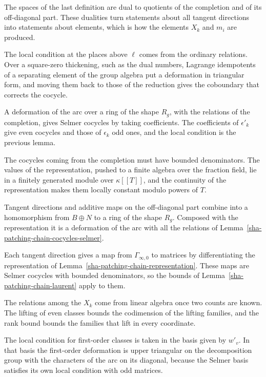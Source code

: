 The spaces of the last definition are dual to quotients of the completion and of its off-diagonal part. These dualities turn statements about all tangent directions into statements about elements, which is how the elements $X_k$ and $m_i$ are produced.

The local condition at the places above $\ell$ comes from the ordinary relations. Over a square-zero thickening, such as the dual numbers, Lagrange idempotents of a separating element of the group algebra put a deformation in triangular form, and moving them back to those of the reduction gives the coboundary that corrects the cocycle.

A deformation of the arc over a ring of the shape $R_g$, with the relations of the completion, gives Selmer cocycles by taking coefficients. The coefficients of $\epsilon'_k$ give even cocycles and those of $\epsilon_k$ odd ones, and the local condition is the previous lemma.

The cocycles coming from the completion must have bounded denominators. The values of the representation, pushed to a finite algebra over the fraction field, lie in a finitely generated module over $\kappa[[T]]$, and the continuity of the representation makes them locally constant modulo powers of $T$.

Tangent directions and additive maps on the off-diagonal part combine into a homomorphism from $B\oplus N$ to a ring of the shape $R_g$. Composed with the representation it is a deformation of the arc with all the relations of Lemma~\ref{sha-patching-chain-cocycles-selmer}.

Each tangent direction gives a map from $\Gamma_{\infty,0}$ to matrices by differentiating the representation of Lemma~\ref{sha-patching-chain-representation}. These maps are Selmer cocycles with bounded denominators, so the bounds of Lemma~\ref{sha-patching-chain-laurent} apply to them.

The relations among the $X_k$ come from linear algebra once two counts are known. The lifting of even classes bounds the codimension of the lifting families, and the rank bound bounds the families that lift in every coordinate.

The local condition for first-order classes is taken in the basis given by $w'_v$. In that basis the first-order deformation is upper triangular on the decomposition group with the characters of the arc on its diagonal, because the Selmer basis satisfies its own local condition with odd matrices.

